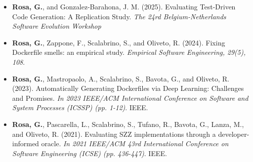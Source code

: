      \begin{itemize}
      \item[C1.] \textbf{Rosa, G.}, and Gonzalez-Barahona, J. M. (2025). Evaluating Test-Driven Code Generation: A Replication Study. \emph{The 24rd Belgium-Netherlands Software Evolution Workshop}
      \item[C2.] \textbf{Rosa, G.}, Zappone, F., Scalabrino, S., and Oliveto, R. (2024). Fixing Dockerfile smells: an empirical study. \emph{Empirical Software Engineering, 29(5), 108}.
      \item[C3.] \textbf{Rosa, G.}, Mastropaolo, A., Scalabrino, S., Bavota, G., and Oliveto, R. (2023). Automatically Generating Dockerfiles via Deep Learning: Challenges and Promises. \emph{In 2023 IEEE/ACM International Conference on Software and System Processes (ICSSP) (pp. 1-12)}. IEEE.
     \item[C4.] \textbf{Rosa, G.}, Pascarella, L., Scalabrino, S., Tufano, R., Bavota, G., Lanza, M., and Oliveto, R. (2021). Evaluating SZZ implementations through a developer-informed oracle. \emph{In 2021 IEEE/ACM 43rd International Conference on Software Engineering (ICSE) (pp. 436-447)}. IEEE.
     \end{itemize}